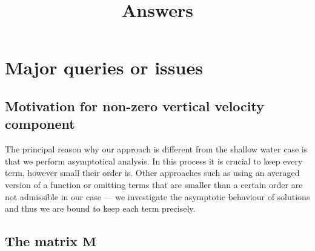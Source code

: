 \documentclass[11pt]{article}
\title{Answers}
\date{}
\begin{document}
\maketitle

\section{Major queries or issues}

\subsection{Motivation for non-zero vertical velocity component}

The principal reason why our approach is different from the shallow water case is that we perform asymptotical analysis. In this process it is crucial to keep every term, however small their order is. Other approaches such as using an averaged version of a function or omitting terms that are smaller than a certain order are not admissible in our case --- we investigate the asymptotic behaviour of solutions and thus we are bound to keep each term precisely.

\subsection{The matrix $\mathbf{M}$}\label{M---lambda}
\end{document}

